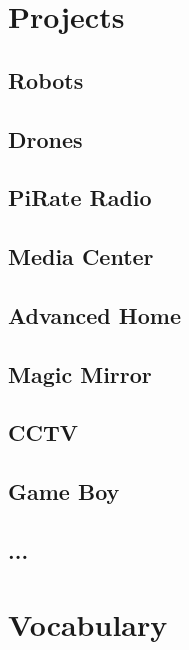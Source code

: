 \documentclass[10pt,a4paper]{article}
\begin{document}
\section{Projects}

\subsection{Robots}
\subsection{Drones}
\subsection{PiRate Radio}
\subsection{Media Center}
\subsection{Advanced Home}
\subsection{Magic Mirror}
\subsection{CCTV}
\subsection{Game Boy}
\subsection{...}

\newpage

\section{Vocabulary}
\end{document}
